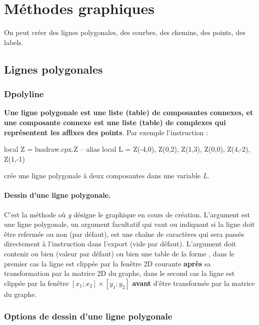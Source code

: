 \section{Méthodes graphiques}

On peut créer des lignes polygonales, des courbes, des chemins, des points, des labels.


\subsection{Lignes polygonales}

\subsubsection{Dpolyline}

\textbf{Une ligne polygonale est une liste (table) de composantes connexes, et une composante connexe est une liste (table) de complexes qui représentent les affixes des points}. Par exemple l'instruction :
\begin{Luacode}
local Z = luadraw.cpx.Z -- alias
local L = { {Z(-4,0), Z(0,2), Z(1,3)}, {Z(0,0), Z(4,-2), Z(1,-1)} }
\end{Luacode}
crée une ligne polygonale à deux composantes dans une variable \emph{L}.

\paragraph{Dessin d'une ligne polygonale.}

C'est la méthode  où \emph{g} désigne le graphique en cours de création. L'argument  est une ligne polygonale,  un argument facultatif qui vaut \true ou \false indiquant si la ligne doit être refermée ou non (\false par défaut),  est une chaîne de caractères qui sera passée directement à l'instruction \drawcmd dans l'export (vide par défaut). L'argument  doit contenir ou bien \nil (valeur par défaut) ou bien une table de la forme ,  dans le premier cas la ligne est clippée par la fenêtre 2D courante \textbf{après} sa transformation par la matrice 2D du graphe, dans le second cas la ligne est clippée par la fenêtre $[x_1;x_2]\times[y_1;y_2]$ \textbf{avant} d'être transformée par la matrice du graphe.

\subsubsection{Options de dessin d'une ligne polygonale}

